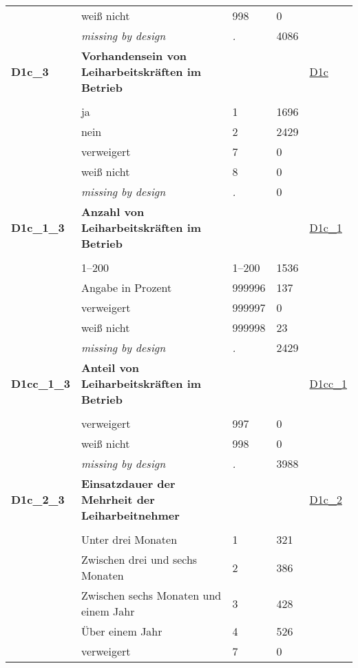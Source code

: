 \begin{longtable}{| L{2.65cm} | L{8cm} | C{1.5cm} | R{1.25cm} | C{2.25cm}  |}
   & weiß nicht & 998 & 0 &  \\ 
   & \textit{missing by design} & \textit{.} & 4086 &  \\ 
   \midrule
\textbf{D1c\_3}\label{var:D1c:3} & \textbf{Vorhandensein von Leiharbeitskräften im Betrieb} &  &  & \hyperref[D1c]{D1c} \\ 
   &  &  &  &  \\ 
   & ja & 1 & 1696 &  \\ 
   & nein & 2 & 2429 &  \\ 
   & verweigert & 7 & 0 &  \\ 
   & weiß nicht & 8 & 0 &  \\ 
   & \textit{missing by design} & \textit{.} & 0 &  \\ 
   \midrule
\textbf{D1c\_1\_3}\label{var:D1c:1:3} & \textbf{Anzahl von Leiharbeitskräften im Betrieb} &  &  & \hyperref[D1c:1]{D1c\_1} \\ 
   &  &  &  &  \\ 
   & 1--200 & 1--200 & 1536 &  \\ 
   & Angabe in Prozent & 999996 & 137 &  \\ 
   & verweigert & 999997 & 0 &  \\ 
   & weiß nicht & 999998 & 23 &  \\ 
   & \textit{missing by design} & \textit{.} & 2429 &  \\ 
   \midrule
\textbf{D1cc\_1\_3}\label{var:D1cc:1:3} & \textbf{Anteil von Leiharbeitskräften im Betrieb} &  &  & \hyperref[D1cc:1]{D1cc\_1} \\ 
   &  &  &  &  \\ 
   & verweigert & 997 & 0 &  \\ 
   & weiß nicht & 998 & 0 &  \\ 
   & \textit{missing by design} & \textit{.} & 3988 &  \\ 
   \midrule
\textbf{D1c\_2\_3}\label{var:D1c:2:3} & \textbf{Einsatzdauer der Mehrheit der Leiharbeitnehmer} &  &  & \hyperref[D1c:2]{D1c\_2} \\ 
   &  &  &  &  \\ 
   & Unter drei Monaten & 1 & 321 &  \\ 
   & Zwischen drei und sechs Monaten & 2 & 386 &  \\ 
   & Zwischen sechs Monaten und einem Jahr & 3 & 428 &  \\ 
   & Über einem Jahr & 4 & 526 &  \\ 
   & verweigert & 7 & 0 &  \\ 

\end{longtable}
